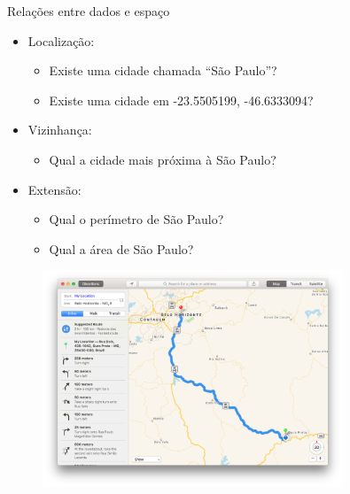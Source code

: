 	\begin{frame}{Relações entre dados e espaço}
		\begin{itemize}
			\setlength{\itemsep}{1.2em}
			\item Localização:
			\begin{itemize}
				\item Existe uma cidade chamada ``São Paulo''?
				\item Existe uma cidade em -23.5505199, -46.6333094?
			\end{itemize}
			
			\item Vizinhança:
			\begin{itemize}
				\item Qual a cidade mais próxima à São Paulo?
			\end{itemize}
			
			\item Extensão:
			\begin{itemize}
				\item Qual o perímetro de São Paulo?
				\item Qual a área de São Paulo?
			\end{itemize}
		\end{itemize}
	\end{frame}
	
	\begin{frame}
		\begin{figure}
			\centering
			\includegraphics[width=0.80\textwidth]{img/localizacao_1.png}
		\end{figure}
	\end{frame}
	

